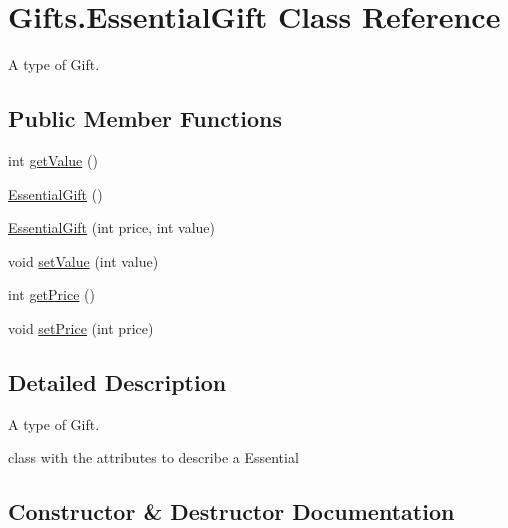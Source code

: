 \hypertarget{class_gifts_1_1_essential_gift}{}\section{Gifts.\+Essential\+Gift Class Reference}
\label{class_gifts_1_1_essential_gift}


A type of Gift.  


\subsection*{Public Member Functions}
\begin{DoxyCompactItemize}
\item 
int \hyperlink{class_gifts_1_1_essential_gift_a80b1f00031aef05d47af12a042d06371}{get\+Value} ()
\item 
\hyperlink{class_gifts_1_1_essential_gift_ab89a6bbe135f9df519aacfe1495892e1}{Essential\+Gift} ()
\item 
\hyperlink{class_gifts_1_1_essential_gift_a9a98d0ea91a1cf3d90682a0120e0b350}{Essential\+Gift} (int price, int value)
\item 
void \hyperlink{class_gifts_1_1_essential_gift_a704eae1a58c9e959ae0077717ca43851}{set\+Value} (int value)
\item 
int \hyperlink{class_gifts_1_1_essential_gift_a77b6e64a87945412d70fa9f6f24a8967}{get\+Price} ()
\item 
void \hyperlink{class_gifts_1_1_essential_gift_a8200c84857db3ac2306fbbc086c12676}{set\+Price} (int price)
\end{DoxyCompactItemize}


\subsection{Detailed Description}
A type of Gift. 

class with the attributes to describe a Essential 

\subsection{Constructor \& Destructor Documentation}
\mbox{\label{class_gifts_1_1_essential_gift_ab89a6bbe135f9df519aacfe1495892e1}} 
